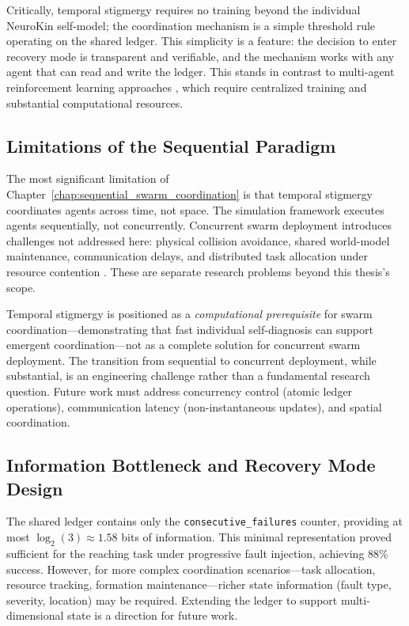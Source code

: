 \documentclass[12pt,a4paper,oneside]{report}
\begin{document}
Critically, temporal stigmergy requires no training beyond the individual NeuroKin self-model; the coordination mechanism is a simple threshold rule operating on the shared ledger. This simplicity is a feature: the decision to enter recovery mode is transparent and verifiable, and the mechanism works with any agent that can read and write the ledger. This stands in contrast to multi-agent reinforcement learning approaches \cite{domberg2026selfadapting, daneshmand2026slowrl}, which require centralized training and substantial computational resources.
\subsection{Limitations of the Sequential Paradigm}
\label{subsec:limitations_of_the_sequential_paradigm}

The most significant limitation of Chapter~\ref{chap:sequential_swarm_coordination} is that temporal stigmergy coordinates agents across time, not space. The simulation framework executes agents sequentially, not concurrently. Concurrent swarm deployment introduces challenges not addressed here: physical collision avoidance, shared world-model maintenance, communication delays, and distributed task allocation under resource contention \cite{matsuki2024gaussian, keetha2024splattam}. These are separate research problems beyond this thesis's scope.

Temporal stigmergy is positioned as a \textit{computational prerequisite} for swarm coordination---demonstrating that fast individual self-diagnosis can support emergent coordination---not as a complete solution for concurrent swarm deployment. The transition from sequential to concurrent deployment, while substantial, is an engineering challenge rather than a fundamental research question. Future work must address concurrency control (atomic ledger operations), communication latency (non-instantaneous updates), and spatial coordination.
\subsection{Information Bottleneck and Recovery Mode Design}
\label{subsec:information_bottleneck_and_recovery_mode_design}

The shared ledger contains only the \texttt{consecutive\_failures} counter, providing at most $\log_2(3) \approx 1.58$ bits of information. This minimal representation proved sufficient for the reaching task under progressive fault injection, achieving 88\% success. However, for more complex coordination scenarios---task allocation, resource tracking, formation maintenance---richer state information (fault type, severity, location) may be required. Extending the ledger to support multi-dimensional state is a direction for future work.
\end{document}
